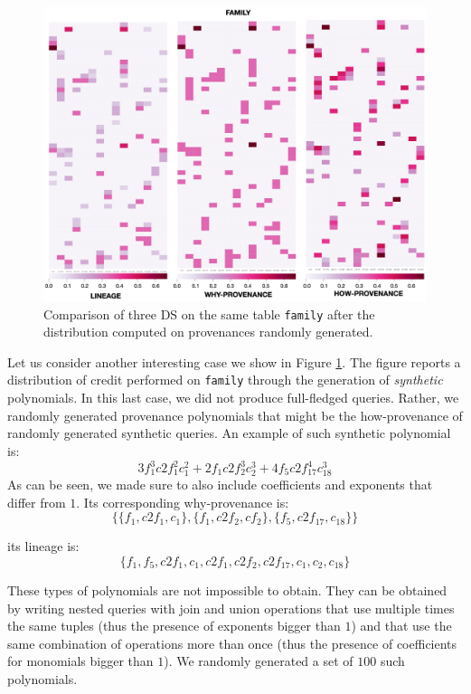 \begin{figure}[tb]
  \includegraphics[width=1\textwidth]{figures/synthetic_polynomials_2}
  \caption{Comparison of three DS on the same table \texttt{family} after the distribution computed on provenances randomly generated.}
  \label{figure:comparison_on_synthetic_polynomials_2}
\end{figure}

Let us consider another interesting case we show in Figure \ref{figure:comparison_on_synthetic_polynomials_2}. 
The figure reports a distribution of credit performed on \texttt{family} through the generation of \emph{synthetic} polynomials. 
In this last case, we did not produce full-fledged queries. Rather, we randomly generated provenance polynomials that might be the how-provenance of randomly generated synthetic queries. 
An example of such synthetic polynomial is:
\[
3 f_1^3 c2f_1^2 c_1^2 + 2 f_1 c2f_2^3 c_2^3 + 4 f_5 c2f_{17}^4 c_{18}^3
\] 
As can be seen, we made sure to also include coefficients and exponents that differ from $1$.
Its corresponding why-provenance is: 
\[
\{ \{f_1, c2f_1, c_1\}, \{f_1, c2f_2, cf_2\}, \{ f_5, c2f_{17}, c_{18}\} \}
\] 

its lineage is: 
\[
\{f_1, f_5, c2f_1, c_1, c2f_1, c2f_2, c2f_{17}, c_1, c_2, c_{18} \}
\]
 
These types of polynomials are not impossible to obtain. 
They can be obtained by writing nested queries with join and union operations that use multiple times the same tuples (thus the presence of exponents bigger than $1$) and that use the same combination of operations more than once (thus the presence of coefficients for monomials bigger than $1$). 
We randomly generated a set of $100$ such polynomials. 

